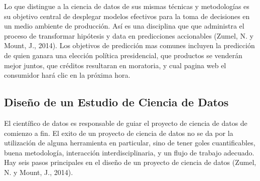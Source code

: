 \documentclass[letterpaper, spanish, 11pt]{report}
\begin{document}
Lo que distingue a la ciencia de datos de sus mismas técnicas y metodologías es su objetivo central de desplegar modelos efectivos para la toma de decisiones en un medio ambiente de producción. Así es una disciplina que que administra el proceso de transformar hipótesis y data en predicciones accionables (Zumel, N. y Mount, J., 2014). Los objetivos de predicción mas comunes incluyen la predicción de quien ganara una elección política presidencial, que productos se venderán mejor juntos, que créditos resultaran en moratoria, y cual pagina web el consumidor hará clic en la próxima hora.

\subsection{Diseño de un Estudio de Ciencia de Datos}
El científico de datos es responsable de guiar el proyecto de ciencia de datos de comienzo a fin. El exito de un proyecto de ciencia de datos no se da por la utilización de alguna herramienta en particular, sino de tener goles cuantificables, buena metodología, interacción interdisciplinaria, y un flujo de trabajo adecuado. Hay seis pasos principales en el diseño de un proyecto de ciencia de datos (Zumel, N. y Mount, J., 2014).
\end{document}

